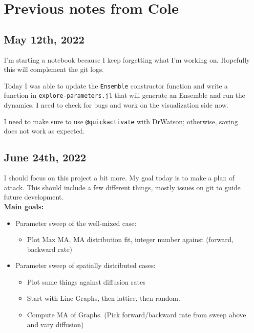 \documentclass[11pt]{book}
\begin{document}
\tableofcontents

\chapter{Previous notes from Cole}

\section{May 12th, 2022}

I'm starting a notebook because I keep forgetting what I'm working on. Hopefully this will complement the git logs.

Today I was able to update the \texttt{Ensemble} constructor function and write a function in \texttt{explore-parameters.jl} that will generate an Ensemble and run the dynamics. I need to check for bugs and work on the visualization side now.

I need to make sure to use \texttt{@quickactivate} with DrWatson; otherwise, saving does not work as expected.

\section{June 24th, 2022}

I should focus on this project a bit more. My goal today is to make a plan of attack. This should include a few different things, mostly issues on git to guide future development.\\

\textbf{Main goals:}

\begin{itemize}
    \item Parameter sweep of the well-mixed case:
    \begin{itemize}
        \item Plot Max MA, MA distribution fit, integer number against (forward, backward rate)
    \end{itemize}

    \item Parameter sweep of spatially distributed cases:
    \begin{itemize}
        \item Plot same things against diffusion rates
        \item Start with Line Graphs, then lattice, then random.
        \item Compute MA of Graphs. (Pick forward/backward rate from sweep above and vary diffusion)
    \end{itemize}
\end{itemize}
\end{document}
